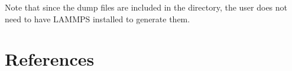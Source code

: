 \documentclass[authoryear]{elsarticle}
\begin{document}
Note that since the dump files are included in the directory, the user does not need to
have LAMMPS installed to generate them. \\

\newpage
\section*{References}


\end{document}
